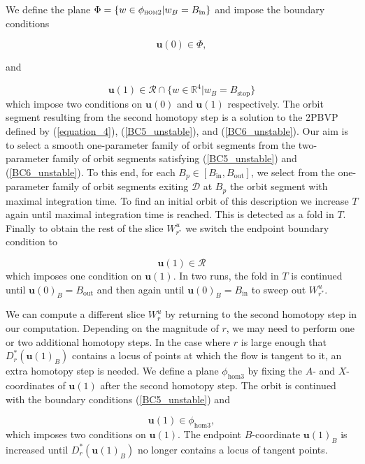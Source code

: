 \documentclass{ws-ijbc}
\begin{document}
We define the plane $\Phi = \{w \in \phi_{\textsc{hom2}}| w_B=B_{\mathrm{in}}\}$ and impose the boundary conditions

\begin{equation}
\mathbf{u}(0) \in \Phi,
\label{BC5_unstable}
\end{equation}

and 

\begin{equation}
\mathbf{u}(1) \in \mathscr{R} \cap \{ w \in \mathbb{R}^4 | w_B=B_{\mathrm{stop}}\}
\label{BC6_unstable}
\end{equation}
\noindent
which impose two conditions on $\mathbf{u}(0)$ and $\mathbf{u}(1)$ respectively.  The orbit segment resulting from the second homotopy step is a solution to the 2PBVP defined by (\ref{equation_4}), (\ref{BC5_unstable}), and (\ref{BC6_unstable}).  Our aim is to select a smooth one-parameter family of orbit segments from the two-parameter family of orbit segments satisfying (\ref{BC5_unstable}) and (\ref{BC6_unstable}).  To this end, for each $B_p \in [B_{\mathrm{in}},B_{\mathrm{out}}]$, we select from the one-parameter family of orbit segments exiting $\mathscr{D}$ at $B_p$ the orbit segment with maximal integration time.  To find an initial orbit of this description we increase $T$ again until maximal integration time is reached.  This is detected as a fold in $T$.  Finally to obtain the rest of the slice $W^u_{r^*}$ we switch the endpoint boundary condition to

\begin{equation}
\mathbf{u}(1) \in \mathscr{R}
\label{BC7_unstable}
\end{equation}
\noindent
which imposes one condition on $\mathbf{u}(1)$.  In two runs, the fold in $T$ is continued until $\mathbf{u}(0)_B=B_{\mathrm{out}}$ and then again until $\mathbf{u}(0)_B=B_{\mathrm{in}}$ to sweep out $W^u_{r^*}$.

We can compute a different slice $W^u_r$ by returning to the second homotopy step in our computation.   Depending on the magnitude of $r$, we may need to perform one or two additional homotopy steps.  In the case where $r$ is large enough that $D^*_r(\mathbf{u}(1)_B)$ contains a locus of points at which the flow is tangent to it, an extra homotopy step is needed.  We define a plane $\phi_{\mathrm{hom3}}$ by fixing the $A$- and $X$-coordinates of $\mathbf{u}(1)$ after the second homotopy step.  The orbit is continued with the boundary conditions (\ref{BC5_unstable}) and

\begin{equation}
\mathbf{u}(1) \in \phi_{\mathrm{hom3}},
\label{BC8_unstable}
\end{equation}
\noindent
which imposes two conditions on $\mathbf{u}(1)$.  The endpoint $B$-coordinate $\mathbf{u}(1)_B$ is increased until $D^*_r(\mathbf{u}(1)_B)$ no longer contains a locus of tangent points.
\end{document}
